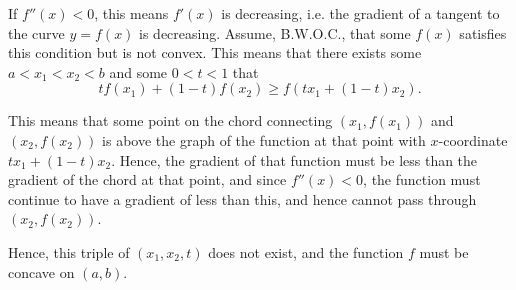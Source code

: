 \Question{\currfilebase}

\begin{center}
    
\end{center}

If \(f''(x) < 0\), this means \(f'(x)\) is decreasing, i.e. the gradient of a tangent to the curve \(y = f(x)\) is decreasing. Assume, B.W.O.C., that some \(f(x)\) satisfies this condition but is not convex. This means that there exists some \(a < x_1 < x_2 < b\) and some \(0 < t < 1\) that
\[
    t f(x_1) + (1 - t) f(x_2) \geq f(tx_1 + (1 - t) x_2).
\]

This means that some point on the chord connecting \((x_1, f(x_1))\) and \((x_2, f(x_2))\) is above the graph of the function at that point with \(x\)-coordinate \(t x_1 + (1 - t) x_2\). Hence, the gradient of that function must be less than the gradient of the chord at that point, and since \(f''(x) < 0\), the function must continue to have a gradient of less than this, and hence cannot pass through \((x_2, f(x_2))\).

Hence, this triple of \((x_1, x_2, t)\) does not exist, and the function \(f\) must be concave on \((a, b)\).

